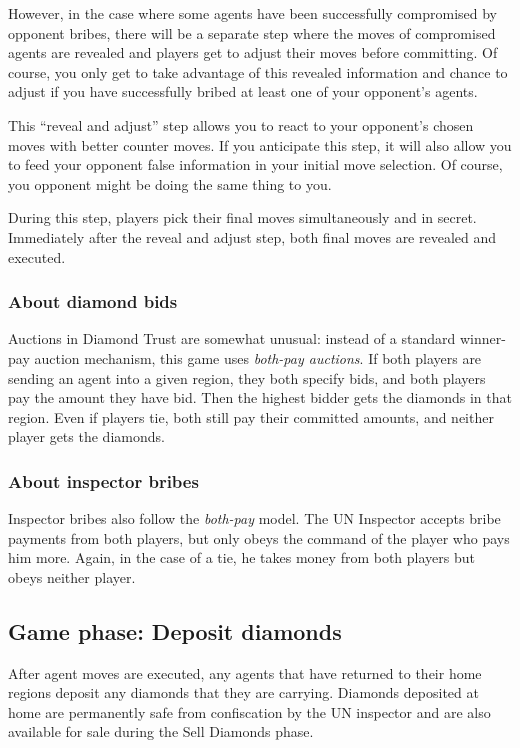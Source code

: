 \documentclass[8pt]{extbook}
\begin{document}
However, in the case where some agents have been successfully compromised by opponent bribes, there will be a separate step where the moves of compromised agents are revealed and players get to adjust their moves before committing.  Of course, you only get to take advantage of this revealed information and chance to adjust if you have successfully bribed at least one of your opponent's agents.

This ``reveal and adjust'' step allows you to react to your opponent's chosen moves with better counter moves.  If you anticipate this step, it will also allow you to feed your opponent false information in your initial move selection.  Of course, you opponent might be doing the same thing to you.

During this step, players pick their final moves simultaneously and in secret.  Immediately after the reveal and adjust step, both final moves are revealed and executed.

\subsubsection{About diamond bids}
Auctions in Diamond Trust are somewhat unusual:  instead of a standard winner-pay auction mechanism, this game uses {\it both-pay auctions}.  If both players are sending an agent into a given region, they both specify bids, and both players pay the amount they have bid.  Then the highest bidder gets the diamonds in that region.  Even if players tie, both still pay their committed amounts, and neither player gets the diamonds.

\subsubsection{About inspector bribes}
Inspector bribes also follow the {\it both-pay} model.  The UN Inspector accepts bribe payments from both players, but only obeys the command of the player who pays him more.  Again, in the case of a tie, he takes money from both players but obeys neither player.

\subsection{Game phase:  Deposit diamonds}
After agent moves are executed, any agents that have returned to their home regions deposit any diamonds that they are carrying.  Diamonds deposited at home are permanently safe from confiscation by the UN inspector and are also available for sale during the Sell Diamonds phase.
\end{document}
